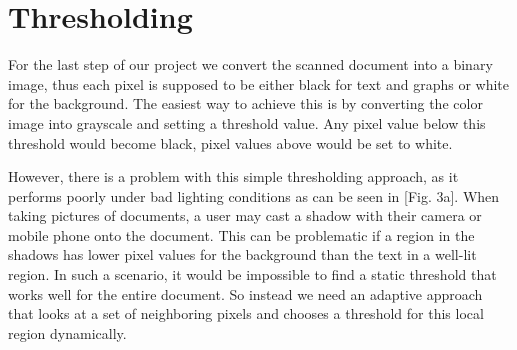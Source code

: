 \documentclass[bibliography=totoc]{scrartcl}
\begin{document}
	\section{Thresholding}
	For the last step of our project we convert the scanned document into a binary image, thus each pixel is supposed to be either black for text and graphs or white for the background.
	The easiest way to achieve this is by converting the color image into grayscale and setting a threshold value. 
	Any pixel value below this threshold would become black, pixel values above would be set to white.

	However, there is a problem with this simple thresholding approach, as it performs poorly under bad lighting conditions as can be seen in [Fig. 3a].
	When taking pictures of documents, a user may cast a shadow with their camera or mobile phone onto the document. 
	This can be problematic if a region in the shadows has lower pixel values for the background than the text in a well-lit region.
	In such a scenario, it would be impossible to find a static threshold that works well for the entire document.
	So instead we need an adaptive approach that looks at a set of neighboring pixels and chooses a threshold for this local region dynamically. \\
\end{document}
